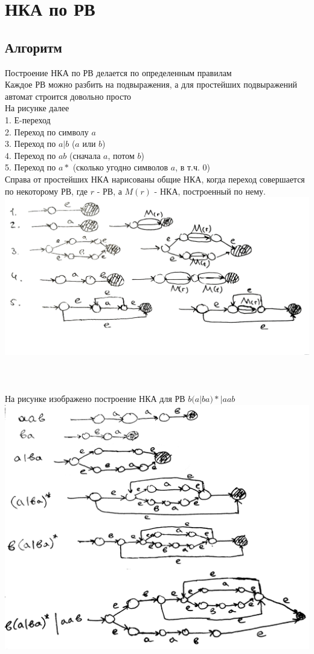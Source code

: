 \documentclass[14pt]{extreport}
\begin{document}
	\chapter{НКА по РВ}
	\section{Алгоритм}
	Построение НКА по РВ делается по определенным правилам\\
	Каждое РВ можно разбить на подвыражения, а для простейших подвыражений автомат строится
	довольно просто\\
	На рисунке далее\\
	1. Е-переход\\
	2. Переход по символу $a$\\
	3. Переход по $a|b$ ($a$ или $b$)\\
	4. Переход по $ab$ (сначала $a$, потом $b$)\\
	5. Переход по $a*$ (сколько угодно символов $a$, в т.ч. 0)\\
	Справа от простейших НКА нарисованы общие НКА, когда переход совершается
	по некоторому РВ, где $r$ - РВ, а $M(r)$ - НКА, построенный по нему.\\
	\includegraphics[scale=0.15]{data/pic1_1.png}\\\\\\\\
	На рисунке изображено построение НКА для РВ $b(a|ba)*|aab$\\
	\includegraphics[scale=0.15]{data/pic1_2.png}\\
\end{document}
